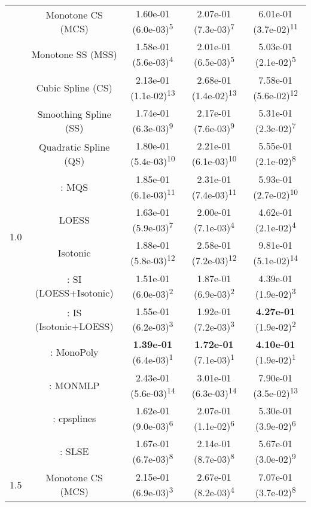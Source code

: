 \begin{tabular}{ccccc}
\midrule
\multirow{14}{*}{1.0}&Monotone CS (MCS)& 1.60e-01 (6.0e-03)\textsuperscript{5}& 2.07e-01 (7.3e-03)\textsuperscript{7}& 6.01e-01 (3.7e-02)\textsuperscript{11}\tabularnewline
&Monotone SS (MSS)& 1.58e-01 (5.6e-03)\textsuperscript{4}& 2.01e-01 (6.5e-03)\textsuperscript{5}& 5.03e-01 (2.1e-02)\textsuperscript{5}\tabularnewline
&Cubic Spline (CS)& 2.13e-01 (1.1e-02)\textsuperscript{13}& 2.68e-01 (1.4e-02)\textsuperscript{13}& 7.58e-01 (5.6e-02)\textsuperscript{12}\tabularnewline
&Smoothing Spline (SS)& 1.74e-01 (6.3e-03)\textsuperscript{9}& 2.17e-01 (7.6e-03)\textsuperscript{9}& 5.31e-01 (2.3e-02)\textsuperscript{7}\tabularnewline
&Quadratic Spline (QS)& 1.80e-01 (5.4e-03)\textsuperscript{10}& 2.21e-01 (6.1e-03)\textsuperscript{10}& 5.55e-01 (2.1e-02)\textsuperscript{8}\tabularnewline
&\textcite{heMonotoneBsplineSmoothing1998}: MQS& 1.85e-01 (6.1e-03)\textsuperscript{11}& 2.31e-01 (7.4e-03)\textsuperscript{11}& 5.93e-01 (2.7e-02)\textsuperscript{10}\tabularnewline
&LOESS& 1.63e-01 (5.9e-03)\textsuperscript{7}& 2.00e-01 (7.1e-03)\textsuperscript{4}& 4.62e-01 (2.1e-02)\textsuperscript{4}\tabularnewline
&Isotonic& 1.88e-01 (5.8e-03)\textsuperscript{12}& 2.58e-01 (7.2e-03)\textsuperscript{12}& 9.81e-01 (5.1e-02)\textsuperscript{14}\tabularnewline
&\textcite{mammenEstimatingSmoothMonotone1991}: SI (LOESS+Isotonic)& 1.51e-01 (6.0e-03)\textsuperscript{2}& 1.87e-01 (6.9e-03)\textsuperscript{2}& 4.39e-01 (1.9e-02)\textsuperscript{3}\tabularnewline
&\textcite{mammenEstimatingSmoothMonotone1991}: IS (Isotonic+LOESS)& 1.55e-01 (6.2e-03)\textsuperscript{3}& 1.92e-01 (7.2e-03)\textsuperscript{3}& \textbf{4.27e-01} (1.9e-02)\textsuperscript{2}\tabularnewline
&\textcite{murrayFastFlexibleMethods2016}: MonoPoly& \textbf{1.39e-01} (6.4e-03)\textsuperscript{1}& \textbf{1.72e-01} (7.1e-03)\textsuperscript{1}& \textbf{4.10e-01} (1.9e-02)\textsuperscript{1}\tabularnewline
&\textcite{cannonMonmlpMultilayerPerceptron2017}: MONMLP& 2.43e-01 (5.6e-03)\textsuperscript{14}& 3.01e-01 (6.3e-03)\textsuperscript{14}& 7.90e-01 (3.5e-02)\textsuperscript{13}\tabularnewline
&\textcite{navarro-garciaConstrainedSmoothingOutofrange2023}: cpsplines& 1.62e-01 (9.0e-03)\textsuperscript{6}& 2.07e-01 (1.1e-02)\textsuperscript{6}& 5.30e-01 (3.9e-02)\textsuperscript{6}\tabularnewline
&\textcite{groeneboomConfidenceIntervalsMonotone2023}: SLSE& 1.67e-01 (6.7e-03)\textsuperscript{8}& 2.14e-01 (8.7e-03)\textsuperscript{8}& 5.67e-01 (3.0e-02)\textsuperscript{9}\tabularnewline
\midrule
\multirow{14}{*}{1.5}&Monotone CS (MCS)& 2.15e-01 (6.9e-03)\textsuperscript{3}& 2.67e-01 (8.2e-03)\textsuperscript{4}& 7.07e-01 (3.7e-02)\textsuperscript{8}\tabularnewline

\end{tabular}
